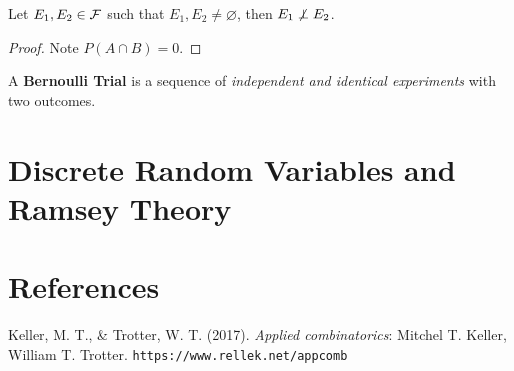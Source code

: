 \documentclass{article}
\begin{document}
			\begin{proposition}
				Let $E_1, E_2 \in \mathcal{{F}}$ such that $E_1, E_2 \neq \varnothing$, then $E_1 \centernot \perp E_2$.
				\begin{proof}
					Note $P(A \cap B) = 0$.
				\end{proof}
			\end{proposition}
			
			\begin{definition}
				A \textbf{Bernoulli Trial} is a sequence of \emph{independent and identical experiments} with two outcomes.
			\end{definition}
			
	\section{Discrete Random Variables and Ramsey Theory}
			
	\newpage
	\section*{References}
		\par Keller, M. T., \& Trotter, W. T. (2017). \emph{Applied combinatorics}: Mitchel T. Keller, William T. Trotter. \texttt{https://www.rellek.net/appcomb}
\end{document}
